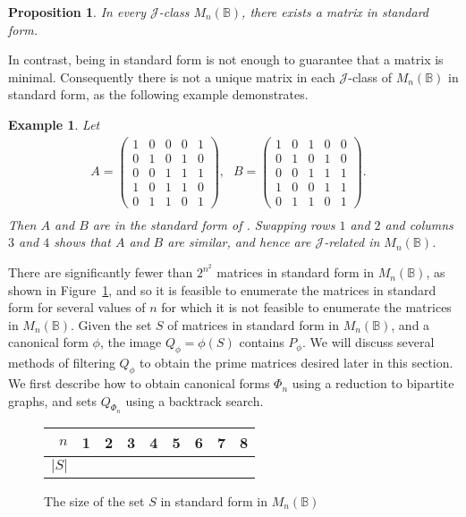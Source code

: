 \documentclass[11pt]{article}
\newtheorem{prop}[thm]{Proposition}
\newtheorem{exa}[thm]{Example}
\newenvironment{ex}{\begin{exa}\rm}{\end{exa}}
\numberwithin{equation}{section}
\newcommand{\B}{\mathbb{B}}
\newcommand{\Bn}{M_n(\B)}
\newcommand{\J}{\mathscr{J}}
\begin{document}
\begin{prop}
  In every $\J$-class $\Bn$, there exists a matrix in standard form. 
\end{prop}

In contrast, being in standard form is not enough to guarantee that a matrix is
minimal. Consequently there is not a unique matrix in each $\J$-class of $\Bn$
in standard form, as the following example demonstrates. 
\begin{ex}
Let
\begin{align*}
  A = \begin{pmatrix}
    1 & 0 & 0 & 0 & 1 \\
    0 & 1 & 0 & 1 & 0 \\
    0 & 0 & 1 & 1 & 1 \\
    1 & 0 & 1 & 1 & 0 \\
    0 & 1 & 1 & 0 & 1 
  \end{pmatrix}\text{,}&
  B = \begin{pmatrix}
    1 & 0 & 1 & 0 & 0 \\
    0 & 1 & 0 & 1 & 0 \\
    0 & 0 & 1 & 1 & 1 \\
    1 & 0 & 0 & 1 & 1 \\
    0 & 1 & 1 & 0 & 1 
  \end{pmatrix}.&\\
\end{align*}
Then $A$ and $B$ are in the standard form of
. Swapping rows $1$ and $2$ and columns $3$
and $4$ shows that $A$ and $B$ are similar, and hence are $\J$-related in $\Bn$.
\end{ex}

There are significantly fewer than $2^{n^2}$ matrices in standard form in $\Bn$,
as shown in Figure~\ref{fig:StandardFormMatrices}, and so it is feasible to
enumerate the matrices in standard form for several values of $n$ for which it
is not feasible to enumerate the matrices in $\Bn$.
Given the set $S$ of matrices in standard form in $\Bn$, and a canonical form
$\phi$, the image $Q_\phi = \phi(S)$ contains $P_\phi$. We will discuss several
methods of filtering $Q_\phi$ to obtain the prime matrices desired later in this
section. We first describe how to obtain canonical forms $\Phi_n$ using a
reduction to bipartite graphs, and sets $Q_{\Phi_n}$ using a backtrack search.

\begin{figure}
  \centering
  \begin{tabular}{r|r|r|r|r|r|r|r|r}
    $n$ & 1 & 2 & 3 & 4 & 5 & 6 & 7 & 8 \\
    \hline
    $|S|$ & & & & & & & & 
  \end{tabular}
\vspace{1cm}

  \caption{The size of the set $S$ in standard form in $\Bn$}
  \label{fig:StandardFormMatrices}
\end{figure}
\end{document}
